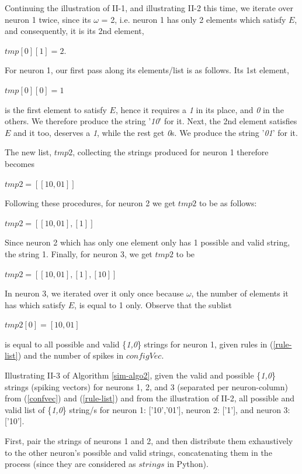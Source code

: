 \documentclass{svmultm}
\begin{document}
Continuing the illustration of II-1, and illustrating II-2 this time, we iterate over neuron 1 twice, since its $\omega$ = 2, i.e. neuron 1 has only 2 elements which satisfy $E$, and consequently, it is its 2nd element,

		$tmp[ 0 ] [ 1 ] = 2.$ 

For neuron 1, our first pass along its elements/list is as follows. Its 1st element,

		$tmp[ 0 ][ 0 ] = 1$

is the first element to satisfy $E$, hence it requires a \textit{1} in its place, and \textit{0} in the others. We therefore produce the string	'\textit{10}' for it. Next, the 2nd element satisfies $E$ and it too, deserves a \textit{1}, while the rest get \textit{0}s. We produce the string '\textit{01}' for it. 

The new list, $tmp2$, collecting the strings produced for neuron 1 therefore becomes

		$tmp2 = [ [ 10, 01 ] ] $

Following these procedures, for neuron 2 we get $tmp2$ to be as follows: 

		$tmp2 = [ [ 10, 01 ], [ 1 ] ]$ 

Since neuron 2 which has only one element only has 1 possible and valid string, the string 1. 
Finally, for neuron 3, we get $tmp2$ to be 

		$tmp2 = [ [ 10, 01 ], [ 1 ], [ 10 ] ] $

In neuron 3, we iterated over it only once because $\omega$, the number of elements it has which satisfy $E$, is equal to 1 only. 
Observe that the sublist 

		$tmp2[ 0 ] = [ 10, 01 ]$ 

is equal to all possible and valid \{\textit{1,0}\} strings for neuron 1, given rules in (\ref{rule-list}) and the number of spikes in $configVec$. 

Illustrating II-3 of Algorithm \ref{sim-algo2}, given the valid and
possible \{\textit{1,0}\} strings (spiking vectors) for neurons 1, 2, and 3 (separated per neuron-column) from (\ref{confvec}) and (\ref{rule-list}) and from the illustration of II-2, all possible and valid list of \{\textit{1,0}\} string/s for neuron 1: ['10','01'], neuron 2: ['1'], and neuron 3: ['10'].

First, pair the strings of neurons 1 and 2, and then distribute them exhaustively to the other neuron's possible and valid strings, concatenating them in the process (since they are considered as $strings$ in Python). 
\end{document}
